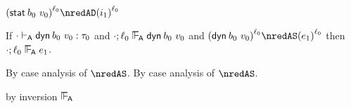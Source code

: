 {\begin{lamportproof*}
    \begin{pfproof}
      \qedstep
        \begin{pfproof}
          $\obars{\estab{\sbnd_0}{\svalue_0}}{\sowner_0} \nredAD \obars{\sint_1}{\sowner_0}$
        \end{pfproof}
    \end{pfproof}

\end{lamportproof*}}

\begin{lemma}\label{A-dyn-label-preservation}\leavevmode
  If\/ $\snil \sWTA \edynb{\sbnd_0}{\svalue_0} : \stype_0$
  and\/ $\snil; \sowner_0 \sWLA \edynb{\sbnd_0}{\svalue_0}$
  and\/ $\obars{\edynb{\sbnd_0}{\svalue_0}}{\sowner_0} \nredAS \obars{\sexpr_1}{\sowner_0}$
  then\/ $\snil; \sowner_0 \sWLA \sexpr_1$.
\end{lemma}{
  \newcommand{\shortproof}{By case analysis of $\nredAS$.}
\begin{lamportproof*}
  \shortproof
\mainproof
  \shortproof

    \begin{pfproof}
      by inversion $\sWLA$
    \end{pfproof}

    \begin{pfproof}
      \qedstep
        \begin{pfproof}
          \begin{mathpar}
          \end{mathpar}
        \end{pfproof}
    \end{pfproof}

    \begin{pfproof}
      \qedstep
    \end{pfproof}

    \begin{pfproof}
      \qedstep
    \end{pfproof}

\end{lamportproof*}}

